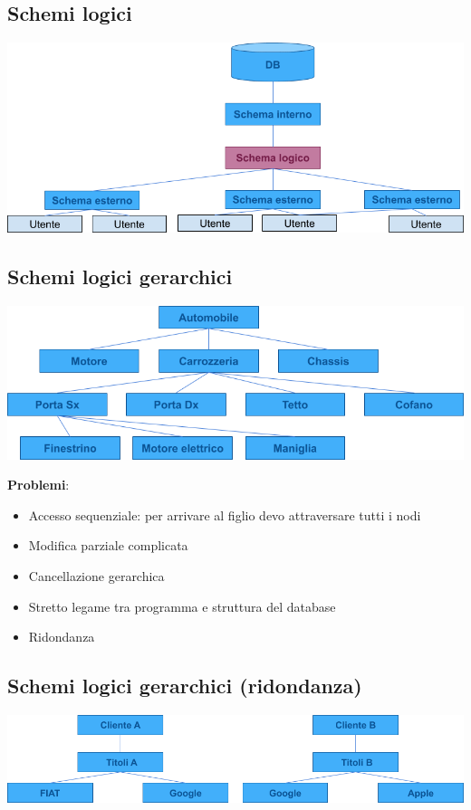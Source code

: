 \documentclass[12pt,a4paper]{article}
\begin{document}
\subsection{Schemi logici}
\begin{center}
\includegraphics[width=0.6\columnwidth]{img/logici.png}
\end{center}

\subsection{Schemi logici gerarchici}
\begin{center}
\includegraphics[width=0.6\columnwidth]{img/gerarchico.png}
\end{center}
\textbf{Problemi}:
\begin{itemize}
\item Accesso sequenziale: per arrivare al figlio devo attraversare tutti i nodi
\item Modifica parziale complicata
\item Cancellazione gerarchica
\item Stretto legame tra programma e struttura del database
\item Ridondanza
\end{itemize}

\subsection{Schemi logici gerarchici (ridondanza)}
\begin{center}
\includegraphics[width=0.6\columnwidth]{img/ridondanza.png}
\end{center}
\end{document}
